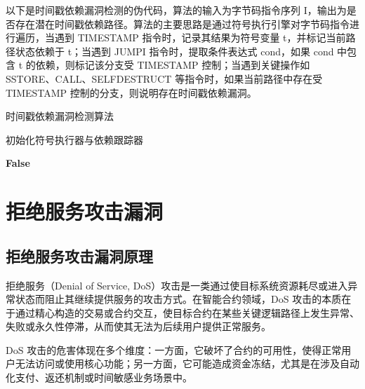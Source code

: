\documentclass[print, master, vlined, timesmath]{DissertUESTC}
\begin{document}
以下是时间戳依赖漏洞检测的伪代码，算法的输入为字节码指令序列 I，输出为是否存在潜在时间戳依赖路径。算法的主要思路是通过符号执行引擎对字节码指令进行遍历，当遇到 TIMESTAMP 指令时，记录其结果为符号变量 t，并标记当前路径状态依赖于 t；当遇到 JUMPI 指令时，提取条件表达式 cond，如果 cond 中包含 t 的依赖，则标记该分支受 TIMESTAMP 控制；当遇到关键操作如 SSTORE、CALL、SELFDESTRUCT 等指令时，如果当前路径中存在受 TIMESTAMP 控制的分支，则说明存在时间戳依赖漏洞。

\begin{algorithm}[H]
    \caption{时间戳依赖漏洞检测算法}
    
    初始化符号执行器与依赖跟踪器\;
    
    
    \Return \textbf{False}
    \end{algorithm}
    
\section{拒绝服务攻击漏洞}
\subsection{拒绝服务攻击漏洞原理}

拒绝服务（Denial of Service, DoS）攻击是一类通过使目标系统资源耗尽或进入异常状态而阻止其继续提供服务的攻击方式。在智能合约领域，DoS 攻击的本质在于通过精心构造的交易或合约交互，使目标合约在某些关键逻辑路径上发生异常、失败或永久性停滞，从而使其无法为后续用户提供正常服务。

DoS 攻击的危害体现在多个维度：一方面，它破坏了合约的可用性，使得正常用户无法访问或使用核心功能；另一方面，它可能造成资金冻结，尤其是在涉及自动化支付、返还机制或时间敏感业务场景中。
\end{document}
